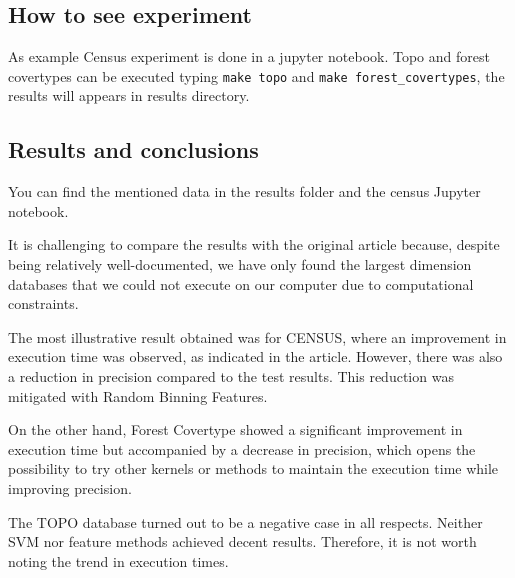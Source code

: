 \subsection*{How to see experiment}

As example Census experiment is done in a jupyter notebook. Topo and forest covertypes can be 
executed typing \texttt{make topo} and \texttt{make forest\_covertypes}, the results will appears 
in results directory. 


\subsection{Results and conclusions}

You can find the mentioned data in the results folder and the census Jupyter notebook.

It is challenging to compare the results with the original article because, despite being relatively well-documented, we have only found the largest dimension databases that we could not execute on our computer due to computational constraints.

The most illustrative result obtained was for CENSUS, where an improvement in execution time was observed, as indicated in the article. However, there was also a reduction in precision compared to the test results. This reduction was mitigated with Random Binning Features.

On the other hand, Forest Covertype showed a significant improvement in execution time but accompanied by a decrease in precision, which opens the possibility to try other kernels or methods to maintain the execution time while improving precision.

The TOPO database turned out to be a negative case in all respects. Neither SVM nor feature methods achieved decent results. Therefore, it is not worth noting the trend in execution times.



